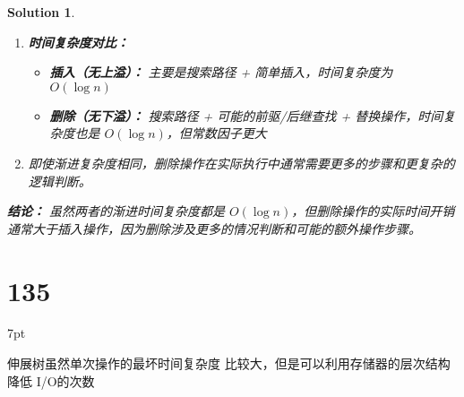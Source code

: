 \documentclass[UTF8]{report}
\newtheorem{solution}{Solution}
\theoremstyle{MyLineTheoremStyle} %
\theoremstyle{MyBlockTheoremStyle} %
\theoremstyle{MySubsubsectionStyle} %
\newenvironment{graybox}{%
        \def\FrameCommand{%
        \hspace{1pt}%
        {\color{gray}\small \vrule width 2pt}%
        {\color{graybox_color}\vrule width 4pt}%
        \colorbox{graybox_color}%
        }%
        \MakeFramed{\advance\hsize-\width\FrameRestore}%
        \noindent\hspace{-4.55pt}%
        \begin{adjustwidth}{}{7pt}%
        \vspace{2pt}\vspace{2pt}%
        }
        {%
        \vspace{2pt}\end{adjustwidth}\endMakeFramed%
        }
\begin{document}
\begin{solution}
\begin{enumerate}
    \item \textbf{时间复杂度对比：}
    \begin{itemize}
        \item \textbf{插入（无上溢）：} 主要是搜索路径 + 简单插入，时间复杂度为 $O(\log n)$
        \item \textbf{删除（无下溢）：} 搜索路径 + 可能的前驱/后继查找 + 替换操作，时间复杂度也是 $O(\log n)$，但常数因子更大
    \end{itemize}

    \item
    即使渐进复杂度相同，删除操作在实际执行中通常需要更多的步骤和更复杂的逻辑判断。
\end{enumerate}

\textbf{结论：}
虽然两者的渐进时间复杂度都是 $O(\log n)$，但删除操作的实际时间开销通常大于插入操作，因为删除涉及更多的情况判断和可能的额外操作步骤。
\end{solution}

\section*{135}
\begin{graybox}
伸展树虽然单次操作的最坏时间复杂度
比较大，但是可以利用存储器的层次结构降低
I/O的次数
\end{graybox}
\end{document}
